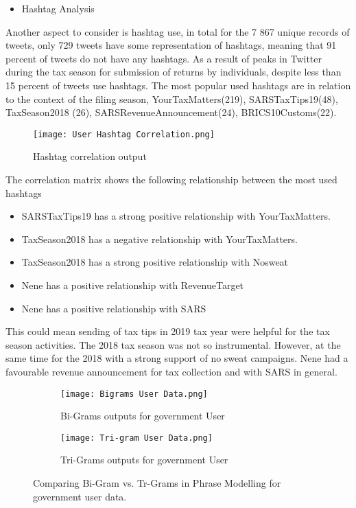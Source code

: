 \begin{itemize}
    \item Hashtag Analysis
\end{itemize}

Another aspect to consider is hashtag use, in total for the 7 867 unique records of tweets, only 729 tweets have some representation of hashtags, meaning that 91 percent of tweets do not have any hashtags.  As a result of peaks in Twitter during the tax season for submission of returns by individuals, despite less than 15 percent of tweets use hashtags. The most popular used hashtags are in relation to the context of the filing season, YourTaxMatters(219), SARSTaxTips19(48), TaxSeason2018 (26), SARSRevenueAnnouncement(24), BRICS10Customs(22).\\

\begin{figure}
    \centering
    \texttt{[image: User Hashtag Correlation.png]}
    \caption{Hashtag correlation output}
    \label{fig:Hashtag correlation for government user}
\end{figure}

The correlation matrix shows the following relationship between the most used hashtags
\begin{itemize}
    \item SARSTaxTips19 has a strong positive relationship with YourTaxMatters.  
    \item TaxSeason2018 has a negative relationship with YourTaxMatters.  
    \item TaxSeason2018 has a strong positive relationship with Nosweat
    \item  Nene has a positive relationship with RevenueTarget
    \item  Nene has a positive relationship with SARS 
\end{itemize}

This could mean sending of tax tips in 2019 tax year were helpful for the tax season activities.  The 2018 tax season was not so instrumental.  However, at the same time for the 2018 with a strong support of no sweat campaigns.  Nene had a favourable revenue announcement for tax collection and with SARS in general.

\begin{figure}
      \centering
	    \begin{subfigure}{0.6\linewidth}
		\texttt{[image: Bigrams User Data.png]}
		\caption{Bi-Grams outputs for government User}
		\label{fig: Associated Bi-Grams Outputs}
	   \end{subfigure}
	   \begin{subfigure}{0.6\linewidth}
		\texttt{[image: Tri-gram User Data.png]}
		\caption{Tri-Grams outputs for government User}
		\label{fig:Associated Tri-Gram Outputs}
	    \end{subfigure}
	   \vfill
	 \caption{Comparing Bi-Gram vs. Tr-Grams in Phrase Modelling for government user data.}
\end{figure}

